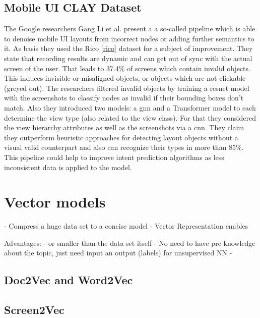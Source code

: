 \subsection{Mobile UI CLAY Dataset}

The Google researchers Gang Li et al. \cite{clay} present a a so-called  pipeline which is able to denoise mobile UI layouts from incorrect nodes or adding further semantics to it.
As basis they used the Rico \ref{rico} dataset for a subject of improvement.
They state that recording results are dynamic and can get out of sync with the actual screen of the user.
That leads to 37.4\% of screens which contain invalid objects.
This induces invisible or misaligned objects, or objects which are not clickable (greyed out).
The researchers filtered invalid objects by training a \gls{resnet} model with the screenshots to classify nodes as invalid if their bounding boxes don't match.
Also they introduced two models: a \gls{gnn} and a Transformer model to each determine the view type (also related to the view class).
For that they considered the view hierarchy attributes as well as the screenshots via a \gls{cnn}.
They claim they outperform heuristic approaches for detecting layout objects without a visual valid counterpart and also can recognize their types in more than 85\%.
This pipeline could help to improve intent prediction algorithms as less inconsistent data is applied to the model.


\section{Vector models}

- Compress a huge data set to a concise model
- Vector Representation enables

Advantages:
-  or smaller than the data set itself
- No need to have pre knowledge about the topic, just need input an output (labels) for unsupervised NN
-

\subsection{Doc2Vec and Word2Vec}
\cite{le2014distributed}

\subsection{Screen2Vec}
\label{subsec:screen2vec}


